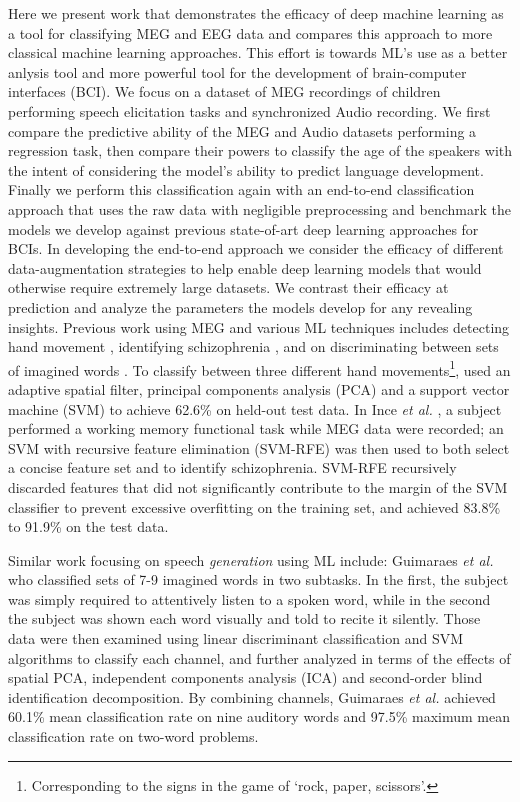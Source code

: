 \documentclass[utf8]{frontiersSCNS} %
\begin{document}
Here we present work that demonstrates the efficacy of deep machine learning as a tool for classifying MEG and EEG data and compares this approach to more classical machine learning approaches. This effort is towards ML's use as a better anlysis tool and more powerful tool for the development of brain-computer interfaces (BCI). We focus on a dataset of MEG recordings of children performing speech elicitation tasks and synchronized Audio recording. We first compare the predictive ability of the MEG and Audio datasets performing a regression task, then compare their powers to classify the age of the speakers with the intent of considering the model's ability to predict language development. Finally we perform this classification again with an end-to-end classification approach that uses the raw data with negligible preprocessing and benchmark the models we develop against previous state-of-art deep learning approaches for BCIs. In developing the end-to-end approach we consider the efficacy of different data-augmentation strategies to help enable deep learning models that would otherwise require extremely large datasets. We contrast their efficacy at prediction and analyze the parameters the models develop for any revealing insights. Previous work using MEG and various ML techniques includes detecting hand movement \cite{Asano2009}, identifying schizophrenia \cite{Ince2008}, and on discriminating between sets of imagined words \cite{Guimaraes2007}. To classify between three different hand movements\footnote{Corresponding to the signs in the game of `rock, paper, scissors'.}, \cite{Asano2009} used an adaptive spatial filter, principal components analysis (PCA) and a support vector machine (SVM) to achieve 62.6\% on held-out test data. In Ince {\em et al.} \cite{Ince2008}, a subject performed a working memory functional task while MEG data were recorded; an SVM with recursive feature elimination (SVM-RFE) was then used to both select a concise feature set and to identify schizophrenia. SVM-RFE recursively discarded features that did not significantly contribute to the margin of the SVM classifier to prevent excessive overfitting on the training set, and achieved 83.8\% to 91.9\% on the test data.


Similar work focusing on speech \emph{generation} using ML include: Guimaraes {\em et al.} \cite{Guimaraes2007} who classified sets of 7-9 imagined words in two subtasks. In the first, the subject was simply required to attentively listen to a spoken word, while in the second the subject was shown each word visually and told to recite it silently. Those data were then examined using linear discriminant classification and SVM algorithms to classify each channel, and further analyzed in terms of the effects of spatial PCA, independent components analysis (ICA) and second-order blind identification decomposition. By combining channels, Guimaraes {\em et al.} achieved 60.1\% mean classification rate on nine auditory words and 97.5\% maximum mean classification rate on two-word problems.
\end{document}
